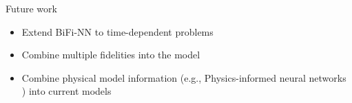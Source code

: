 \documentclass[10pt]{beamer}
\begin{document}
\begin{frame}{Future work}
\begin{itemize}
	\item Extend BiFi-NN to time-dependent problems
	\item Combine multiple fidelities into the model
	\item Combine physical model information (e.g., Physics-informed neural networks \cite{raissi2017physics}) into current models
\end{itemize}
\end{frame}




\end{document}

